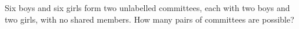 Six boys and six girls form two unlabelled committees, each with two boys and two girls, with no shared members. How many pairs of committees are possible?
